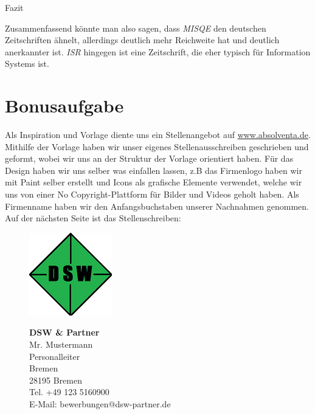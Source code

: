 \documentclass[12pt,utf8]{scrartcl}
\begin{document}
\begin{flushleft}
{\Large Fazit}

Zusammenfassend könnte man also sagen, dass \emph{MISQE} den deutschen Zeitschriften ähnelt, allerdings deutlich mehr Reichweite hat und deutlich anerkannter ist. \emph{ISR} hingegen ist eine Zeitschrift, die eher typisch für Information Systems ist.

\section*{\label{sec:bonus}Bonusaufgabe}

Als Inspiration und Vorlage diente uns ein Stellenangebot auf \href{https://www.absolventa.de/stellenangebote/289852-p-junior-it-consultant-m-w-business-intelligence#external-job-offer}{www.absolventa.de}\cite{online1}. Mithilfe der Vorlage haben wir unser eigenes Stellenausschreiben geschrieben und geformt, wobei wir uns an der Struktur der Vorlage orientiert haben. Für das Design haben wir uns selber was einfallen lassen, z.B das Firmenlogo haben wir mit Paint selber erstellt und Icons als grafische Elemente verwendet, welche wir uns von einer No Copyright-Plattform für Bilder und Videos geholt haben\cite{online2}. Als Firmenname haben wir den Anfangsbuchstaben unserer Nachnahmen genommen. Auf der nächsten Seite ist das Stellenschreiben:

\newpage
{}
\begin{figure}[htbp]
	\begin{minipage}[t]{4cm}
		\vspace{0pt}
		\centering
		\includegraphics{images/Logo}
		\label{fig:Logo}
	\end{minipage}
	\hfill
	\begin{minipage}[t]{4cm}
		\vspace{0pt}
		\scriptsize
		\textbf{DSW \& Partner}\\
		Mr. Mustermann\\
		Personalleiter\\
		Bremen\\
		28195 Bremen\\
		Tel. +49 123 5160900 \\
		E-Mail: bewerbungen@dsw-partner.de
	\end{minipage}
\end{figure}


\end{flushleft}
\end{document}
